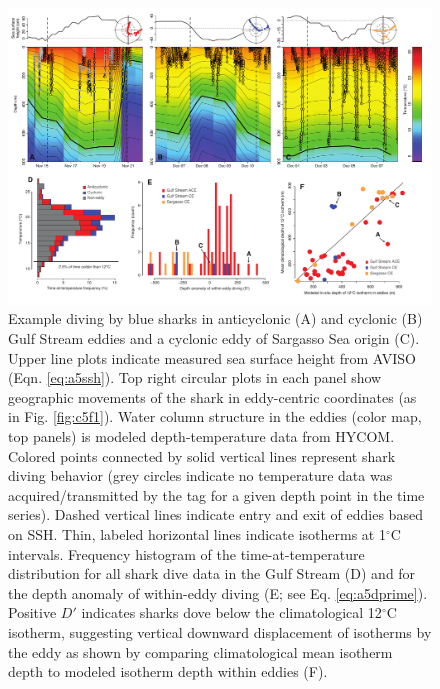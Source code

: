 \begin{figure}[htbp]
\centering
\includegraphics[width=\textwidth]{images/C5_Fig3.pdf}
\caption[Example diving by blue sharks in Gulf Stream eddies and a Sargasso Sea cyclone]{Example diving by blue sharks in anticyclonic (A) and cyclonic (B) Gulf Stream eddies and a cyclonic eddy of Sargasso Sea origin (C). Upper line plots indicate measured sea surface height from AVISO (Eqn. \ref{eq:a5ssh}). Top right circular plots in each panel show geographic movements of the shark in eddy-centric coordinates (as in Fig. \ref{fig:c5f1}). Water column structure in the eddies (color map, top panels) is modeled depth-temperature data from HYCOM. Colored points connected by solid vertical lines represent shark diving behavior (grey circles indicate no temperature data was acquired/transmitted by the tag for a given depth point in the time series). Dashed vertical lines indicate entry and exit of eddies based on SSH. Thin, labeled horizontal lines indicate isotherms at 1$^\circ$C intervals. Frequency histogram of the time-at-temperature distribution for all shark dive data in the Gulf Stream (D) and for the depth anomaly of within-eddy diving (E; see Eq. \ref{eq:a5dprime}). Positive $D'$ indicates sharks dove below the climatological 12$^\circ$C isotherm, suggesting vertical downward displacement of isotherms by the eddy as shown by comparing climatological mean isotherm depth to \is modeled isotherm depth within eddies (F).}
\label{fig:c5f3}
\end{figure}

